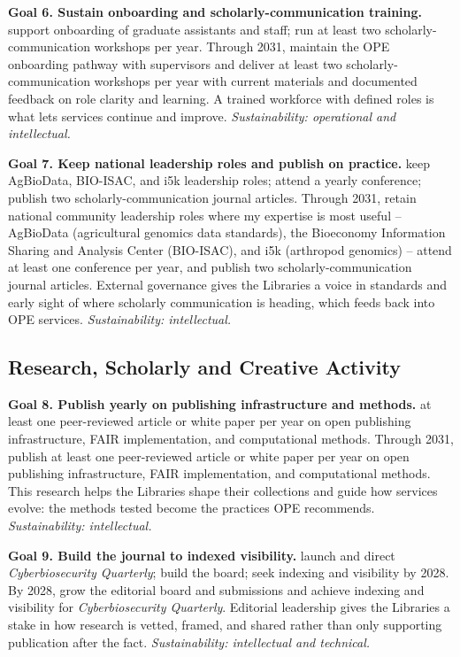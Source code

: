 \textbf{Goal 6. Sustain onboarding and scholarly-communication training.}  support onboarding of graduate assistants and staff; run at least two scholarly-communication workshops per year. Through 2031, maintain the OPE onboarding pathway with supervisors and deliver at least two scholarly-communication workshops per year with current materials and documented feedback on role clarity and learning. A trained workforce with defined roles is what lets services continue and improve. \textit{Sustainability: operational and intellectual.}

\textbf{Goal 7. Keep national leadership roles and publish on practice.}  keep AgBioData, BIO-ISAC, and i5k leadership roles; attend a yearly conference; publish two scholarly-communication journal articles. Through 2031, retain national community leadership roles where my expertise is most useful -- AgBioData (agricultural genomics data standards), the Bioeconomy Information Sharing and Analysis Center (BIO-ISAC), and i5k (arthropod genomics) -- attend at least one conference per year, and publish two scholarly-communication journal articles. External governance gives the Libraries a voice in standards and early sight of where scholarly communication is heading, which feeds back into OPE services. \textit{Sustainability: intellectual.}

\subsection{Research, Scholarly and Creative Activity}
\textbf{Goal 8. Publish yearly on publishing infrastructure and methods.}  at least one peer-reviewed article or white paper per year on open publishing infrastructure, FAIR implementation, and computational methods. Through 2031, publish at least one peer-reviewed article or white paper per year on open publishing infrastructure, FAIR implementation, and computational methods. This research helps the Libraries shape their collections and guide how services evolve: the methods tested become the practices OPE recommends. \textit{Sustainability: intellectual.}

\textbf{Goal 9. Build the journal to indexed visibility.}  launch and direct \textit{Cyberbiosecurity Quarterly}; build the board; seek indexing and visibility by 2028. By 2028, grow the editorial board and submissions and achieve indexing and visibility for \textit{Cyberbiosecurity Quarterly}. Editorial leadership gives the Libraries a stake in how research is vetted, framed, and shared rather than only supporting publication after the fact. \textit{Sustainability: intellectual and technical.}

